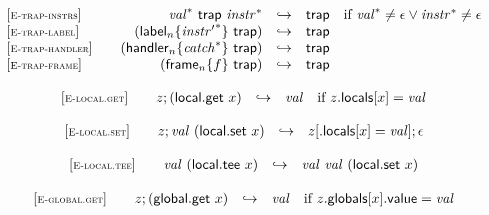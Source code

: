 $$
\begin{array}[t]{@{}lrcl@{}l@{}}
{[\textsc{\scriptsize E{-}trap{-}instrs}]} \quad & {{\mathit{val}}^\ast}~\mathsf{trap}~{{\mathit{instr}}^\ast} & \hookrightarrow & \mathsf{trap} & \quad \mbox{if}~ {{\mathit{val}}^\ast} \neq \epsilon \lor {{\mathit{instr}}^\ast} \neq \epsilon \\
{[\textsc{\scriptsize E{-}trap{-}label}]} \quad & ({{\mathsf{label}}_{n}}{\{ {{\mathit{instr}'}^\ast} \}}~\mathsf{trap}) & \hookrightarrow & \mathsf{trap} \\
{[\textsc{\scriptsize E{-}trap{-}handler}]} \quad & ({{\mathsf{handler}}_{n}}{\{ {{\mathit{catch}}^\ast} \}}~\mathsf{trap}) & \hookrightarrow & \mathsf{trap} \\
{[\textsc{\scriptsize E{-}trap{-}frame}]} \quad & ({{\mathsf{frame}}_{n}}{\{ f \}}~\mathsf{trap}) & \hookrightarrow & \mathsf{trap} \\
\end{array}
$$

\vspace{1ex}

$$
\begin{array}[t]{@{}lrcl@{}l@{}}
{[\textsc{\scriptsize E{-}local.get}]} \quad & z ; (\mathsf{local{.}get}~x) & \hookrightarrow & {\mathit{val}} & \quad \mbox{if}~ z{.}\mathsf{locals}{}[x] = {\mathit{val}} \\
\end{array}
$$

$$
\begin{array}[t]{@{}lrcl@{}l@{}}
{[\textsc{\scriptsize E{-}local.set}]} \quad & z ; {\mathit{val}}~(\mathsf{local{.}set}~x) & \hookrightarrow & z{}[{.}\mathsf{locals}{}[x] = {\mathit{val}}] ; \epsilon \\
\end{array}
$$

$$
\begin{array}[t]{@{}lrcl@{}l@{}}
{[\textsc{\scriptsize E{-}local.tee}]} \quad & {\mathit{val}}~(\mathsf{local{.}tee}~x) & \hookrightarrow & {\mathit{val}}~{\mathit{val}}~(\mathsf{local{.}set}~x) \\
\end{array}
$$

\vspace{1ex}

$$
\begin{array}[t]{@{}lrcl@{}l@{}}
{[\textsc{\scriptsize E{-}global.get}]} \quad & z ; (\mathsf{global{.}get}~x) & \hookrightarrow & {\mathit{val}} & \quad \mbox{if}~ z{.}\mathsf{globals}{}[x]{.}\mathsf{value} = {\mathit{val}} \\
\end{array}
$$

